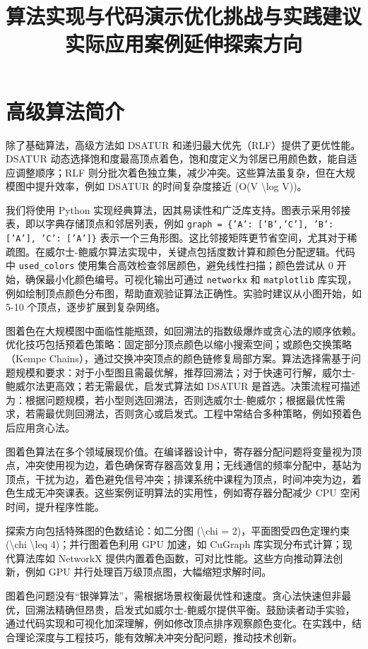 \chapter{高级算法简介}
除了基础算法，高级方法如 DSATUR 和递归最大优先（RLF）提供了更优性能。DSATUR 动态选择饱和度最高顶点着色，饱和度定义为邻居已用颜色数，能自适应调整顺序；RLF 则分批次着色独立集，减少冲突。这些算法虽复杂，但在大规模图中提升效率，例如 DSATUR 的时间复杂度接近 (O(V \textbackslash{}log V))。\par
\title{算法实现与代码演示}
我们将使用 Python 实现经典算法，因其易读性和广泛库支持。图表示采用邻接表，即以字典存储顶点和邻居列表，例如 \texttt{graph = \{{}'A': ['B','C'], 'B': ['A'], 'C': ['A']\}{}} 表示一个三角形图。这比邻接矩阵更节省空间，尤其对于稀疏图。在威尔士-鲍威尔算法实现中，关键点包括度数计算和颜色分配逻辑。代码中 \texttt{used\_{}colors} 使用集合高效检查邻居颜色，避免线性扫描；颜色尝试从 0 开始，确保最小化颜色编号。可视化输出可通过 \texttt{networkx} 和 \texttt{matplotlib} 库实现，例如绘制顶点颜色分布图，帮助直观验证算法正确性。实验时建议从小图开始，如 5-10 个顶点，逐步扩展到复杂网络。\par
\title{优化挑战与实践建议}
图着色在大规模图中面临性能瓶颈，如回溯法的指数级爆炸或贪心法的顺序依赖。优化技巧包括预着色策略：固定部分顶点颜色以缩小搜索空间；或颜色交换策略（Kempe Chains），通过交换冲突顶点的颜色链修复局部方案。算法选择需基于问题规模和要求：对于小型图且需最优解，推荐回溯法；对于快速可行解，威尔士-鲍威尔法更高效；若无需最优，启发式算法如 DSATUR 是首选。决策流程可描述为：根据问题规模，若小型则选回溯法，否则选威尔士-鲍威尔；根据最优性需求，若需最优则回溯法，否则贪心或启发式。工程中常结合多种策略，例如预着色后应用贪心法。\par
\title{实际应用案例}
图着色算法在多个领域展现价值。在编译器设计中，寄存器分配问题将变量视为顶点，冲突使用视为边，着色确保寄存器高效复用；无线通信的频率分配中，基站为顶点，干扰为边，着色避免信号冲突；排课系统中课程为顶点，时间冲突为边，着色生成无冲突课表。这些案例证明算法的实用性，例如寄存器分配减少 CPU 空闲时间，提升程序性能。\par
\title{延伸探索方向}
探索方向包括特殊图的色数结论：如二分图 (\textbackslash{}chi = 2)，平面图受四色定理约束 (\textbackslash{}chi \textbackslash{}leq 4)；并行图着色利用 GPU 加速，如 CuGraph 库实现分布式计算；现代算法库如 NetworkX 提供内置着色函数，可对比性能。这些方向推动算法创新，例如 GPU 并行处理百万级顶点图，大幅缩短求解时间。\par
图着色问题没有“银弹算法”，需根据场景权衡最优性和速度。贪心法快速但非最优，回溯法精确但昂贵，启发式如威尔士-鲍威尔提供平衡。鼓励读者动手实验，通过代码实现和可视化加深理解，例如修改顶点排序观察颜色变化。在实践中，结合理论深度与工程技巧，能有效解决冲突分配问题，推动技术创新。\par
